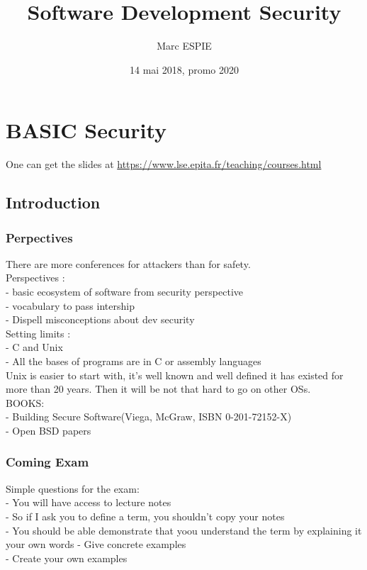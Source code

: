 \documentclass[a4paper,11pt]{article}
\title{Software Development Security}
\author{Marc ESPIE}
\date{14 mai 2018, promo 2020}
\begin{document}

\maketitle

\tableofcontents
\newpage

\section{BASIC Security}

One can get the slides at \url{https://www.lse.epita.fr/teaching/courses.html}

\subsection{Introduction}
\subsubsection{Perpectives}
There are more conferences for attackers than for safety.\\

Perspectives :\\
- basic ecosystem of software from security perspective\\
- vocabulary to pass intership\\
- Dispell misconceptions about dev security\\

Setting limits :\\
- C and Unix\\
- All the bases of programs are in C or assembly languages\\

Unix is easier to start with, it's well known and well defined
it has existed for more than 20 years. Then it will be not that hard to go on other OSs.\\

BOOKS:\\
- Building Secure Software(Viega, McGraw, ISBN  0-201-72152-X)\\
- Open BSD papers\\

\subsubsection{Coming Exam}

Simple questions for the exam:\\
- You will have access to lecture notes\\
- So if I ask you to define a term, you shouldn't copy your notes\\
- You should be able demonstrate that yoou understand the term by explaining it your own words
- Give concrete examples\\
- Create your own examples\\
\end{document}
